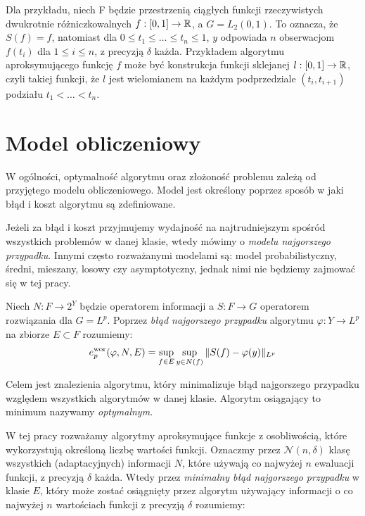 \documentclass[oik, pdftex, man]{mgrwms}
\begin{document}
    Dla przykładu, niech F będzie przestrzenią ciągłych funkcji rzeczywistych dwukrotnie różniczkowalnych $f: [0,1] \rightarrow \mathbb{R}$, a $G=L_{2}(0,1)$. To oznacza, że $S(f) = f$, natomiast dla $0 \leq t_{1} \leq \ldots \leq t_{n} \leq 1$, $y$ odpowiada $n$ obserwacjom $f(t_{i})$ dla $1 \leq i \leq n$, z precyzją $\delta$ każda. Przykładem algorytmu aproksymującego funkcję $f$ może być konstrukcja funkcji sklejanej $l: [0,1] \rightarrow \mathbb{R}$, czyli takiej funkcji, że $l$ jest wielomianem na każdym podprzedziale $(t_{i}, t_{i+1})$ podziału $t_{1} < \ldots < t_{n}$.


\section{Model obliczeniowy}


    W ogólności, optymalność algorytmu oraz złożoność problemu zależą od przyjętego modelu obliczeniowego. Model jest określony poprzez sposób w jaki błąd i koszt algorytmu są zdefiniowane. 
    
    Jeżeli za błąd i koszt przyjmujemy wydajność na najtrudniejszym spośród wszystkich problemów w danej klasie, wtedy mówimy o \textit{modelu najgorszego przypadku}. Innymi często rozważanymi modelami są: model probabilistyczny, średni, mieszany, losowy czy asymptotyczny, jednak nimi nie będziemy zajmować się w tej pracy.

    Niech $N : F \rightarrow 2^{Y}$ będzie operatorem informacji a $S: F \rightarrow G$ operatorem rozwiązania dla $G=L^{p}$. Poprzez \textit{błąd najgorszego przypadku} algorytmu $\varphi : Y \rightarrow L^{p}$ na zbiorze $E \subset F$ rozumiemy:
    \begin{equation*}
        e_{p}^{\mathrm{wor}}(\varphi, N, E) = \sup_{f \in E} \sup_{y \in N(f)} \|S(f) - \varphi(y) \|_{L^{p}}
    \end{equation*}

    Celem jest znalezienia algorytmu, który minimalizuje błąd najgorszego przypadku względem wszystkich algorytmów w danej klasie. Algorytm osiągający to minimum nazywamy \textit{optymalnym}.

    W tej pracy rozważamy algorytmy aproksymujące funkcje z osobliwością, które wykorzystują określoną liczbę wartości funkcji. Oznaczmy przez $\mathcal{N}(n, \delta)$ klasę wszystkich (adaptacyjnych) informacji $N$, które używają co najwyżej $n$ ewaluacji funkcji, z precyzją $\delta$ każda. Wtedy przez \textit{minimalny błąd najgorszego przypadku} w klasie $E$, który może zostać osiągnięty przez algorytm używający informacji o co najwyżej $n$ wartościach funkcji z precyzją $\delta$ rozumiemy:
\end{document}
